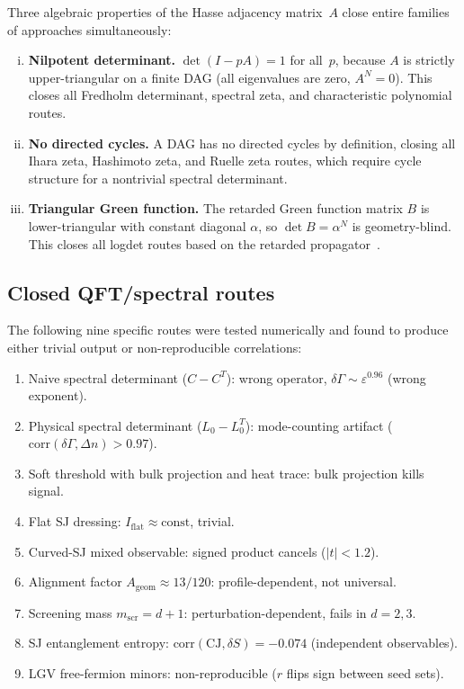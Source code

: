 \documentclass[12pt,a4paper]{article}
\theoremstyle{plain}
\theoremstyle{definition}
\theoremstyle{remark}
\newcommand{\CJ}{\mathrm{CJ}}
\begin{document}
Three algebraic properties of the Hasse adjacency matrix~$A$ close
entire families of approaches simultaneously:
\begin{enumerate}[(i)]
\item \textbf{Nilpotent determinant.}  $\det(I - pA) = 1$ for
  all~$p$, because $A$ is strictly upper-triangular on a finite
  DAG (all eigenvalues are zero, $A^N = 0$).  This closes all
  Fredholm determinant, spectral zeta, and characteristic polynomial
  routes.
\item \textbf{No directed cycles.}  A DAG has no directed cycles
  by definition, closing all Ihara zeta, Hashimoto zeta, and
  Ruelle zeta routes, which require cycle structure for a
  nontrivial spectral determinant.
\item \textbf{Triangular Green function.}  The retarded Green
  function matrix $B$ is lower-triangular with constant diagonal
  $\alpha$, so $\det B = \alpha^N$ is geometry-blind.  This closes
  all logdet routes based on the retarded
  propagator~\cite{Johnston:2008,Johnston:2010}.
\end{enumerate}

\subsection{Closed QFT/spectral routes}
\label{sec:qft-routes}

The following nine specific routes were tested numerically and found
to produce either trivial output or non-reproducible correlations:
\begin{enumerate}
\item Naive spectral determinant ($C - C^T$): wrong operator,
  $\delta\Gamma \sim \varepsilon^{0.96}$ (wrong exponent).
\item Physical spectral determinant ($L_0 - L_0^T$): mode-counting
  artifact ($\text{corr}(\delta\Gamma, \Delta n) > 0.97$).
\item Soft threshold with bulk projection and heat trace: bulk
  projection kills signal.
\item Flat SJ dressing: $I_{\mathrm{flat}} \approx \text{const}$,
  trivial.
\item Curved-SJ mixed observable: signed product cancels
  ($|t| < 1.2$).
\item Alignment factor $A_{\mathrm{geom}} \approx 13/120$:
  profile-dependent, not universal.
\item Screening mass $m_{\mathrm{scr}} = d+1$:
  perturbation-dependent, fails in $d = 2, 3$.
\item SJ entanglement entropy:
  $\text{corr}(\CJ, \delta S) = -0.074$ (independent observables).
\item LGV free-fermion minors: non-reproducible ($r$ flips sign
  between seed sets).
\end{enumerate}
\end{document}
